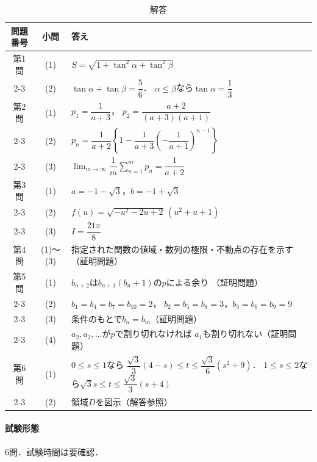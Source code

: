 \documentclass[../../main.tex]{subfiles}
\begin{document}
\begin{table}[htb]
  \centering
  \caption{解答}
  \renewcommand{\arraystretch}{1.4}
  \begin{tabular}{|c|c|p{9cm}|}
    \hline
    \textbf{問題番号} & \textbf{小問} & \textbf{答え} \\
    \hline
    第1問 & (1) & $S=\sqrt{1+\tan^2\alpha+\tan^2\beta}$ \\
    \cline{2-3}
    & (2) & $\tan\alpha+\tan\beta=\dfrac{5}{6}$．
    $\alpha\le\beta$なら$\tan\alpha=\dfrac{1}{3}$ \\
    \hline
    第2問 & (1) & $p_1=\dfrac{1}{a+3}$，
    $p_2=\dfrac{a+2}{(a+3)(a+1)}$ \\
    \cline{2-3}
    & (2) & $p_n=\dfrac{1}{a+2}\left\{1-
    \dfrac{1}{a+3}\left(-\dfrac{1}{a+1}\right)^{n-1}\right\}$ \\
    \cline{2-3}
    & (3) & $\displaystyle\lim_{m\to\infty}\dfrac{1}{m}
    \sum_{n=1}^{m}p_n=\dfrac{1}{a+2}$ \\
    \hline
    第3問 & (1) & $a=-1-\sqrt{3}$，$b=-1+\sqrt{3}$ \\
    \cline{2-3}
    & (2) & $f(u)=\sqrt{-u^2-2u+2}\,(u^2+u+1)$ \\
    \cline{2-3}
    & (3) & $I=\dfrac{21\pi}{8}$ \\
    \hline
    第4問 & (1)〜(3) & 指定された関数の値域・数列の極限・不動点の存在を示す
    （証明問題） \\
    \hline
    第5問 & (1) & $b_{n+2}$は$b_{n+1}(b_n+1)$の$p$による余り
    （証明問題） \\
    \cline{2-3}
    & (2) & $b_1=b_4=b_7=b_{10}=2$，
    $b_2=b_5=b_8=3$，$b_3=b_6=b_9=9$ \\
    \cline{2-3}
    & (3) & 条件のもとで$b_n=b_m$（証明問題） \\
    \cline{2-3}
    & (4) & $a_2,a_3,\ldots$が$p$で割り切れなければ
    $a_1$も割り切れない（証明問題） \\
    \hline
    第6問 & (1) & $0\le s\le1$なら
    $\dfrac{\sqrt{3}}{3}(4-s)\le t\le
    \dfrac{\sqrt{3}}{6}(s^2+9)$．
    $1\le s\le2$なら$\sqrt{3}s\le t\le
    \dfrac{\sqrt{3}}{3}(s+4)$ \\
    \cline{2-3}
    & (2) & 領域$D$を図示（解答参照） \\
    \hline
  \end{tabular}
\end{table}

\paragraph{試験形態}
6問．試験時間は要確認．
\end{document}
